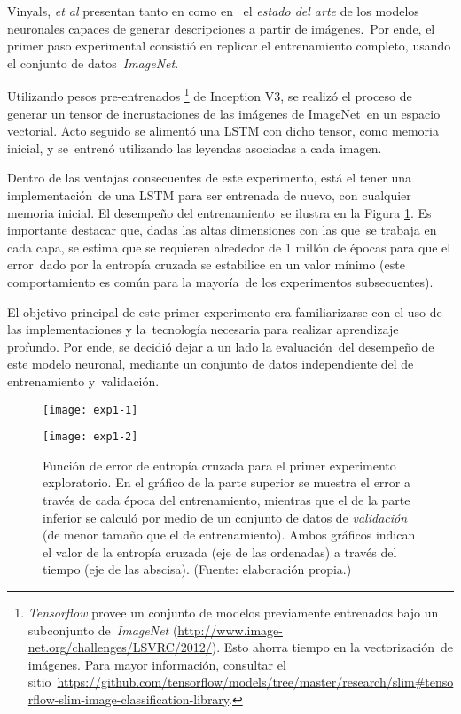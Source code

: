 \noindent
Vinyals, \emph{et al} presentan tanto en \cite{DBLP:journals/corr/VinyalsTBE14} como en \cite{DBLP:journals/corr/VinyalsTBE16}\
el \emph{estado del arte} de los modelos neuronales capaces de generar descripciones a partir de imágenes.\
Por ende, el primer paso experimental consistió en replicar el entrenamiento completo, usando el conjunto de datos\
\emph{ImageNet}.\par
Utilizando pesos pre-entrenados%
\footnote{
  \emph{Tensorflow} provee un conjunto de modelos previamente entrenados bajo un subconjunto de\
  \emph{ImageNet} (\url{http://www.image-net.org/challenges/LSVRC/2012/}). Esto ahorra tiempo en la vectorización\
  de imágenes. Para mayor información, consultar el sitio\
  \url{https://github.com/tensorflow/models/tree/master/research/slim\#tensorflow-slim-image-classification-library}.
} de Inception V3, se realizó el proceso de generar un tensor de incrustaciones de las imágenes de ImageNet\
en un espacio vectorial. Acto seguido se alimentó una LSTM con dicho tensor, como memoria inicial, y se\
entrenó utilizando las leyendas asociadas a cada imagen.\par
Dentro de las ventajas consecuentes de este experimento, está el tener una implementación\
de una LSTM para ser entrenada de nuevo, con cualquier memoria inicial. El desempeño del entrenamiento\
se ilustra en la Figura \ref{exp1}. Es importante destacar que, dadas las altas dimensiones con las que\
se trabaja en cada capa, se estima que se requieren alrededor de 1 millón de épocas para que el error\
dado por la entropía cruzada se estabilice en un valor mínimo (este comportamiento es común para la mayoría\
de los experimentos subsecuentes).\par
El objetivo principal de este primer experimento era familiarizarse con el uso de las implementaciones y la\
tecnología necesaria para realizar aprendizaje profundo. Por ende, se decidió dejar a un lado la evaluación\
del desempeño de este modelo neuronal, mediante un conjunto de datos independiente del de entrenamiento y\
validación.

\begin{figure}[H]
  \centering
  \begin{minipage}[c]{\linewidth}
    \texttt{[image: exp1-1]}
  \end{minipage}\hfill
  \begin{minipage}[c]{\linewidth}
    \texttt{[image: exp1-2]}
  \end{minipage}
  \caption{
    Función de error de entropía cruzada para el primer experimento exploratorio.
    En el gráfico de la parte superior se muestra el error
    a través de cada época del entrenamiento, mientras que el de la parte inferior se
    calculó por medio de un conjunto de datos de \emph{validación} (de menor tamaño que el de entrenamiento).
    Ambos gráficos indican el valor de la entropía cruzada (eje de las ordenadas) a través del
    tiempo (eje de las abscisa).
    (Fuente: elaboración propia.)
  }
  \label{exp1}
\end{figure}

